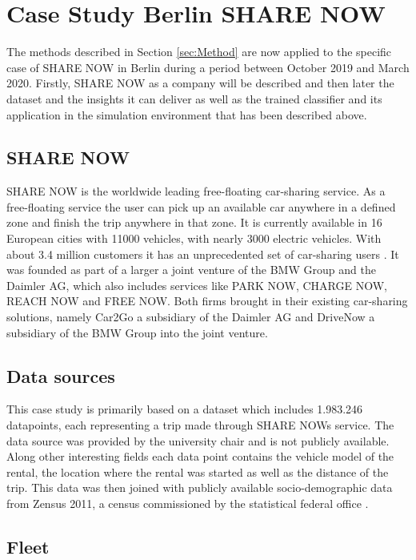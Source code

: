 \clearpage
\section{Case Study Berlin SHARE NOW}
\label{sec:CaseStudy}

The methods described in Section \ref{sec:Method} are now applied to the specific case
of SHARE NOW in Berlin during a period between October 2019 and March 2020. Firstly,
SHARE NOW as a company will be described and then later the dataset and the insights it
can deliver as well as the trained classifier and its application in the simulation
environment that has been described above. 

\subsection{SHARE NOW}

SHARE NOW is the worldwide leading free-floating car-sharing service.
As a free-floating service the user can pick up an available car anywhere in a defined zone
and finish the trip anywhere in that zone. It is currently available in 16 European cities
with 11000 vehicles, with nearly 3000 electric vehicles. With about 3.4 million customers
it has an unprecedented set of car-sharing users \cite{ShareNowAboutUs}. It was founded as 
part of a larger a joint venture of the BMW Group and the Daimler AG, which also includes
services like PARK NOW, CHARGE NOW, REACH NOW and FREE NOW. Both firms brought in their
existing car-sharing solutions, namely Car2Go a subsidiary of the Daimler AG and DriveNow
a subsidiary of the BMW Group into the joint venture. 


\subsection{Data sources}
\label{sub_sec:CaseStudy/Data}

This case study is primarily based on a dataset which includes 1.983.246 datapoints, each 
representing a trip made through SHARE NOWs service. The data source was provided by the university chair and
is not publicly available.
Along other interesting fields each data point
contains the vehicle model of the rental, the location where the rental was started as well as the distance of the trip.
This data was then joined with publicly available socio-demographic data from Zensus 2011, a census
commissioned by the statistical federal office .


\subsection{Fleet}
\label{sub_sec:CaseStudy/Fleet}

